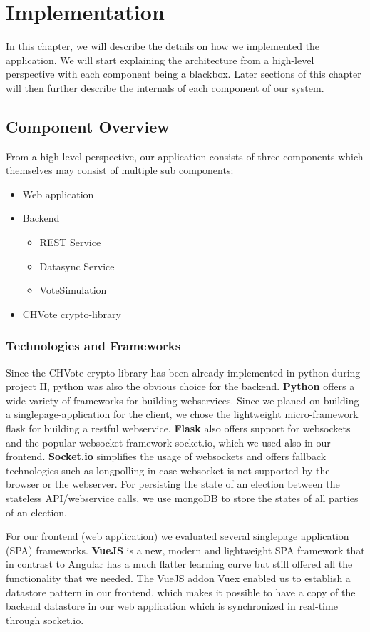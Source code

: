 \chapter{Implementation}
In this chapter, we will describe the details on how we implemented the application. We will start explaining the architecture from a high-level perspective with each component being a blackbox. Later sections of this chapter will then further describe the internals of each component of our system.
\section{Component Overview}
From a high-level perspective, our application consists of three components which themselves may consist of multiple sub components:
\begin{itemize}
	\item Web application
	\item Backend
	\begin{itemize}
		\item REST Service
		\item Datasync Service
		\item VoteSimulation
	\end{itemize}
	\item CHVote crypto-library
\end{itemize}

\subsection{Technologies and Frameworks}
Since the CHVote crypto-library has been already implemented in python during project II, python was also the obvious choice for the backend. \textbf{Python} offers a wide variety of frameworks for building webservices. Since we planed on building a singlepage-application for the client, we chose the lightweight micro-framework flask for building a restful webservice. \textbf{Flask} also offers support for websockets and the popular websocket framework socket.io, which we used also in our frontend. \textbf{Socket.io} simplifies the usage of websockets and offers fallback technologies such as longpolling in case websocket is not supported by the browser or the webserver. For persisting the state of an election between the stateless API/webservice calls, we use mongoDB to store the states of all parties of an election.

For our frontend (web application) we evaluated several singlepage application (SPA) frameworks. \textbf{VueJS} is a new, modern and lightweight SPA framework that in contrast to Angular has a much flatter learning curve but still offered all the functionality that we needed. The VueJS addon Vuex enabled us to establish a datastore pattern in our frontend, which makes it possible to have a copy of the backend datastore in our web application which is synchronized in real-time through socket.io.

